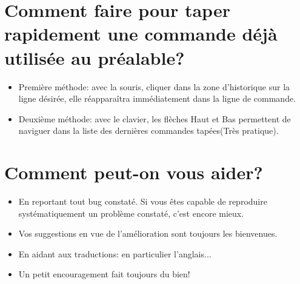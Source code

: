 \section{Comment faire pour taper rapidement une commande déjà utilisée au préalable?}
\begin{itemize}
\item Première méthode: avec la souris, cliquer dans la zone d'historique sur la ligne désirée, elle réapparaîtra immédiatement dans la ligne de commande.
\item Deuxième méthode: avec le clavier, les flèches Haut et Bas permettent de naviguer dans la liste des dernières commandes tapées(Très pratique).
\end{itemize}
 \section{Comment peut-on vous aider?}
\begin{itemize}
\item En reportant tout bug constaté. Si vous êtes capable de reproduire systématiquement un problème constaté, c'est encore mieux. 
\item Vos suggestions en vue de l'amélioration sont toujours les bienvenues.
\item En aidant aux traductions: en particulier l'anglais...
\item Un petit encouragement fait toujours du bien!
\end{itemize}

